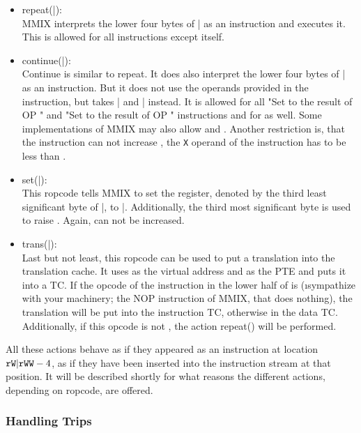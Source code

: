 \begin{itemize}
	\item repeat(|):\\
	MMIX interprets the lower four bytes of | as an instruction and executes it. This is allowed for all instructions except  itself.
	\item continue(|):\\
	Continue is similar to repeat. It does also interpret the lower four bytes of | as an instruction. But it does not use the operands provided in the instruction, but takes | and | instead. It is allowed for all "Set  to the result of  OP " and "Set  to the result of OP " instructions and for  as well. Some implementations of MMIX may also allow  and . Another restriction is, that the instruction can not increase , \ie the {\tt X} operand of the instruction has to be less than .
	\item set(|):\\
	This ropcode tells MMIX to set the register, denoted by the third least significant byte of |, to |. Additionally, the third most significant byte is used to raise . Again,  can not be increased.
	\item trans(|):\\
	Last but not least, this ropcode can be used to put a translation into the translation cache. It uses  as the virtual address and  as the PTE and puts it into a TC. If the opcode of the instruction in the lower half of  is  (\i{sympathize with your machinery}; the NOP instruction of MMIX, that does nothing), the translation will be put into the instruction TC, otherwise in the data TC. Additionally, if this opcode is not , the action repeat() will be performed.
\end{itemize}
All these actions behave as if they appeared as an instruction at location ${\tt rW}|{\tt rWW}-4$, \ie as if they have been inserted into the instruction stream at that position. \citep[pg. 30]{mmix-doc} It will be described shortly for what reasons the different actions, depending on ropcode, are offered.

\subsubsection{Handling Trips}

